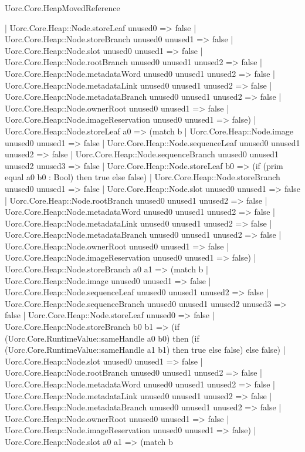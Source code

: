 \begin{lexlean}{Uorc.Core.HeapMovedReference}
\begin{semanticmodule}
{      | Uorc.Core.Heap::Node.storeLeaf unused0 => false
      | Uorc.Core.Heap::Node.storeBranch unused0 unused1 => false
      | Uorc.Core.Heap::Node.slot unused0 unused1 => false
      | Uorc.Core.Heap::Node.rootBranch unused0 unused1 unused2 => false
      | Uorc.Core.Heap::Node.metadataWord unused0 unused1 unused2 => false
      | Uorc.Core.Heap::Node.metadataLink unused0 unused1 unused2 => false
      | Uorc.Core.Heap::Node.metadataBranch unused0 unused1 unused2 => false
      | Uorc.Core.Heap::Node.ownerRoot unused0 unused1 => false
      | Uorc.Core.Heap::Node.imageReservation unused0 unused1 => false)
    | Uorc.Core.Heap::Node.storeLeaf a0 => (match b
      | Uorc.Core.Heap::Node.image unused0 unused1 => false
      | Uorc.Core.Heap::Node.sequenceLeaf unused0 unused1 unused2 => false
      | Uorc.Core.Heap::Node.sequenceBranch unused0 unused1 unused2 unused3 => false
      | Uorc.Core.Heap::Node.storeLeaf b0 => (if (prim equal a0 b0 : Bool) then true else false)
      | Uorc.Core.Heap::Node.storeBranch unused0 unused1 => false
      | Uorc.Core.Heap::Node.slot unused0 unused1 => false
      | Uorc.Core.Heap::Node.rootBranch unused0 unused1 unused2 => false
      | Uorc.Core.Heap::Node.metadataWord unused0 unused1 unused2 => false
      | Uorc.Core.Heap::Node.metadataLink unused0 unused1 unused2 => false
      | Uorc.Core.Heap::Node.metadataBranch unused0 unused1 unused2 => false
      | Uorc.Core.Heap::Node.ownerRoot unused0 unused1 => false
      | Uorc.Core.Heap::Node.imageReservation unused0 unused1 => false)
    | Uorc.Core.Heap::Node.storeBranch a0 a1 => (match b
      | Uorc.Core.Heap::Node.image unused0 unused1 => false
      | Uorc.Core.Heap::Node.sequenceLeaf unused0 unused1 unused2 => false
      | Uorc.Core.Heap::Node.sequenceBranch unused0 unused1 unused2 unused3 => false
      | Uorc.Core.Heap::Node.storeLeaf unused0 => false
      | Uorc.Core.Heap::Node.storeBranch b0 b1 => (if (Uorc.Core.RuntimeValue::sameHandle a0 b0) then (if (Uorc.Core.RuntimeValue::sameHandle a1 b1) then true else false) else false)
      | Uorc.Core.Heap::Node.slot unused0 unused1 => false
      | Uorc.Core.Heap::Node.rootBranch unused0 unused1 unused2 => false
      | Uorc.Core.Heap::Node.metadataWord unused0 unused1 unused2 => false
      | Uorc.Core.Heap::Node.metadataLink unused0 unused1 unused2 => false
      | Uorc.Core.Heap::Node.metadataBranch unused0 unused1 unused2 => false
      | Uorc.Core.Heap::Node.ownerRoot unused0 unused1 => false
      | Uorc.Core.Heap::Node.imageReservation unused0 unused1 => false)
    | Uorc.Core.Heap::Node.slot a0 a1 => (match b
}
\end{semanticmodule}
\end{lexlean}
